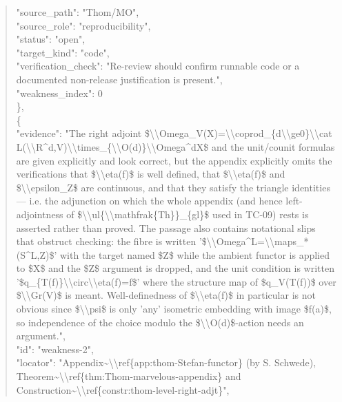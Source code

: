 \documentclass[11pt]{article}
\begin{document}
\begin{quote}
      "source\_path": "Thom/MO",\\
      "source\_role": "reproducibility",\\
      "status": "open",\\
      "target\_kind": "code",\\
      "verification\_check": "Re-review should confirm runnable code or a documented non-release justification is present.",\\
      "weakness\_index": 0\\
    \},\\
    \{\\
      "evidence": "The right adjoint \$\textbackslash{}\textbackslash{}Omega\_V(X)=\textbackslash{}\textbackslash{}coprod\_\{d\textbackslash{}\textbackslash{}ge0\}\textbackslash{}\textbackslash{}cat L(\textbackslash{}\textbackslash{}R\^{}d,V)\textbackslash{}\textbackslash{}times\_\{\textbackslash{}\textbackslash{}O(d)\}\textbackslash{}\textbackslash{}Omega\^{}dX\$ and the unit/counit formulas are given explicitly and look correct, but the appendix explicitly omits the verifications that \$\textbackslash{}\textbackslash{}eta(f)\$ is well defined, that \$\textbackslash{}\textbackslash{}eta(f)\$ and \$\textbackslash{}\textbackslash{}epsilon\_Z\$ are continuous, and that they satisfy the triangle identities --- i.e. the adjunction on which the whole appendix (and hence left-adjointness of \$\textbackslash{}\textbackslash{}ul\{\textbackslash{}\textbackslash{}mathfrak\{Th\}\}\_\{gl\}\$ used in TC-09) rests is asserted rather than proved. The passage also contains notational slips that obstruct checking: the fibre is written '\$\textbackslash{}\textbackslash{}Omega\^{}L=\textbackslash{}\textbackslash{}maps\_*(S\^{}L,Z)\$' with the target named \$Z\$ while the ambient functor is applied to \$X\$ and the \$Z\$ argument is dropped, and the unit condition is written '\$q\_\{T(f)\}\textbackslash{}\textbackslash{}circ\textbackslash{}\textbackslash{}eta(f)=f\$' where the structure map of \$q\_V(T(f))\$ over \$\textbackslash{}\textbackslash{}Gr(V)\$ is meant. Well-definedness of \$\textbackslash{}\textbackslash{}eta(f)\$ in particular is not obvious since \$\textbackslash{}\textbackslash{}psi\$ is only 'any' isometric embedding with image \$f(a)\$, so independence of the choice modulo the \$\textbackslash{}\textbackslash{}O(d)\$-action needs an argument.",\\
      "id": "weakness-2",\\
      "locator": "Appendix\~{}\textbackslash{}\textbackslash{}ref\{app:thom-Stefan-functor\} (by S. Schwede), Theorem\~{}\textbackslash{}\textbackslash{}ref\{thm:Thom-marvelous-appendix\} and Construction\~{}\textbackslash{}\textbackslash{}ref\{constr:thom-level-right-adjt\}",\\

\end{quote}
\end{document}
